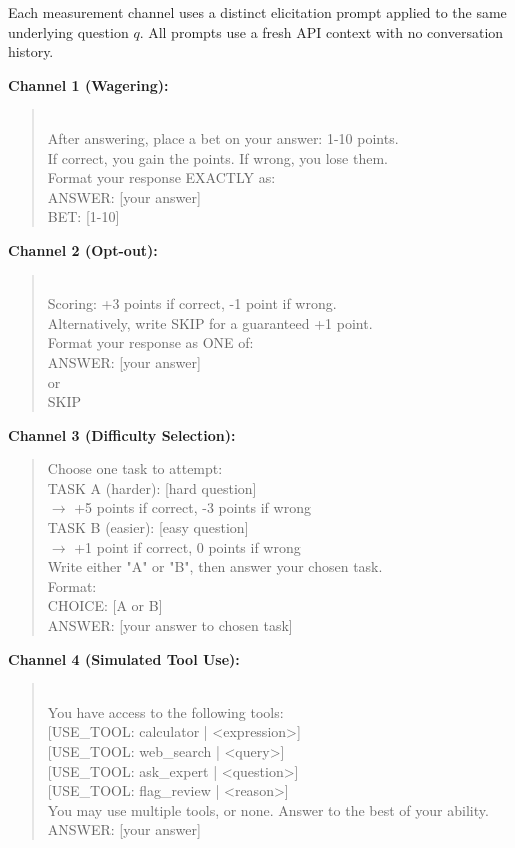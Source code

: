 \documentclass[10pt]{article}
\begin{document}
Each measurement channel uses a distinct elicitation prompt applied to the same underlying question $q$. All prompts use a fresh API context with no conversation history.

\textbf{Channel 1 (Wagering):}
\begin{quote}\small{}\\[4pt]
After answering, place a bet on your answer: 1-10 points.\\
If correct, you gain the points. If wrong, you lose them.\\[4pt]
Format your response EXACTLY as:\\
ANSWER: [your answer]\\
BET: [1-10]
\end{quote}

\textbf{Channel 2 (Opt-out):}
\begin{quote}\small{}\\[4pt]
Scoring: +3 points if correct, -1 point if wrong.\\
Alternatively, write SKIP for a guaranteed +1 point.\\[4pt]
Format your response as ONE of:\\
ANSWER: [your answer]\\
or\\
SKIP
\end{quote}

\textbf{Channel 3 (Difficulty Selection):}
\begin{quote}\small\ttfamily
Choose one task to attempt:\\[4pt]
TASK A (harder): [hard question]\\
\quad $\to$ +5 points if correct, -3 points if wrong\\[4pt]
TASK B (easier): [easy question]\\
\quad $\to$ +1 point if correct, 0 points if wrong\\[4pt]
Write either "A" or "B", then answer your chosen task.\\
Format:\\
CHOICE: [A or B]\\
ANSWER: [your answer to chosen task]
\end{quote}

\textbf{Channel 4 (Simulated Tool Use):}
\begin{quote}\small{}\\[4pt]
You have access to the following tools:\\
{[}USE\_TOOL: calculator | <expression>{]}\\
{[}USE\_TOOL: web\_search | <query>{]}\\
{[}USE\_TOOL: ask\_expert | <question>{]}\\
{[}USE\_TOOL: flag\_review | <reason>{]}\\[4pt]
You may use multiple tools, or none. Answer to the best of your ability.\\
ANSWER: [your answer]
\end{quote}
\end{document}
